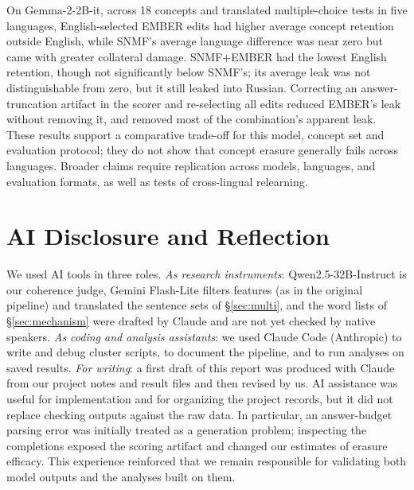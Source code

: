 \documentclass[11pt]{article}
\begin{document}
On Gemma-2-2B-it, across 18 concepts and translated multiple-choice tests in five languages, English-selected EMBER edits had higher average concept retention outside English, while SNMF's average language difference was near zero but came with greater collateral damage. SNMF+EMBER had the lowest English retention, though not significantly below SNMF's; its average leak was not distinguishable from zero, but it still leaked into Russian. Correcting an answer-truncation artifact in the scorer and re-selecting all edits reduced EMBER's leak without removing it, and removed most of the combination's apparent leak. These results support a comparative trade-off for this model, concept set and evaluation protocol; they do not show that concept erasure generally fails across languages. Broader claims require replication across models, languages, and evaluation formats, as well as tests of cross-lingual relearning.

\section*{AI Disclosure and Reflection}

We used AI tools in three roles.
\emph{As research instruments}: Qwen2.5-32B-Instruct is our coherence judge, Gemini Flash-Lite filters features (as in the original pipeline) and translated the sentence sets of \S\ref{sec:multi}, and the word lists of \S\ref{sec:mechanism} were drafted by Claude and are not yet checked by native speakers.
\emph{As coding and analysis assistants}: we used Claude Code (Anthropic) to write and debug cluster scripts, to document the pipeline, and to run analyses on saved results.
\emph{For writing}: a first draft of this report was produced with Claude from our project notes and result files and then revised by us.
AI assistance was useful for implementation and for organizing the project records, but it did not replace checking outputs against the raw data. In particular, an answer-budget parsing error was initially treated as a generation problem; inspecting the completions exposed the scoring artifact and changed our estimates of erasure efficacy. This experience reinforced that we remain responsible for validating both model outputs and the analyses built on them.



\appendix
\end{document}
